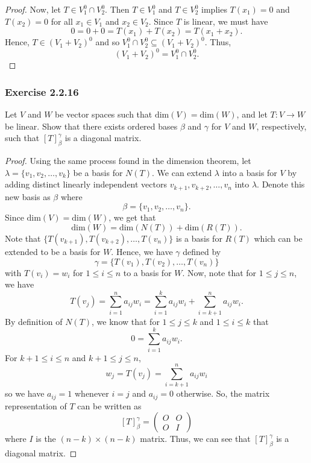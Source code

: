\begin{enumerate}
\begin{proof}
        Now, let \( T \in {V}_{1}^{0} \cap V_{2}^{0} \). Then \( T \in {V}_{1}^{0} \) and \( T \in {V}_{2}^{0} \) implies \( T({x}_{1}) = 0  \) and \( T({x}_{2}) = 0  \) for all \( {x}_{1} \in {V}_{1} \) and \( {x}_{2} \in {V}_{2} \). Since \( T  \) is linear, we must have 
        \[   0 = 0 + 0 =  T({x}_{1}) + T({x}_{2}) = T({x}_{1} + {x}_{2}).  \]
        Hence, \( T \in ({V}_{1} + {V}_{2})^{0}  \) and so \( {V}_{1}^{0} \cap V_{2}^{0} \subseteq ({V}_{1} + {V}_{2})^{0} \). Thus, 
        \[ ({V}_{1} + {V}_{2})^{0} = {V}_{1}^{0} \cap {V}_{2}^{0}. \]
        \end{proof}
\end{enumerate}

\subsubsection{Exercise 2.2.16} Let \( V  \) and \( W  \) be vector spaces such that \( \text{dim}(V) = \text{dim}(W) \), and let \( T: V \to W  \) be linear. Show that there exists ordered bases \( \beta  \) and \( \gamma \) for \( V  \) and \( W  \), respectively, such that \( [T]_{\beta}^{\gamma}  \) is a diagonal matrix.
\begin{proof}
    Using the same process found in the dimension theorem, let \( \lambda = \{ {v}_{1}, {v}_{2}, \dots, {v}_{k } \}   \) be a basis for \( N(T) \). We can extend \( \lambda  \) into a basis for \( V  \) by adding distinct linearly independent vectors \( {v}_{k+1}, {v}_{k+2}, \dots, {v}_{n}   \) into \( \lambda \). Denote this new basis as \( \beta  \) where
\[  \beta = \{ {v}_{1}, {v}_{2}, \dots, {v}_{n} \}. \]
Since \( \text{dim}(V) = \text{dim}(W) \), we get that
\[  \text{dim}(W) = \text{dim}(N(T)) + \text{dim}(R(T)). \tag{1} \] 
Note that \( \{ T({v}_{k+1}), T({v}_{k+2}), \dots, T({v}_{n}) \}  \) is a basis for \( R(T) \) which can be extended to be a basis for \( W  \). Hence, we have \( \gamma \) defined by
\[  \gamma = \{ T({v}_{1}), T({v}_{2}) , \dots,  T({v}_{n})\}  \]
with \( T({v}_{i}) = {w}_{i} \) for \( 1 \leq i \leq n \) to a basis for \( W  \). Now, note that for \( 1 \leq j \leq n \), we have 
\[  T({v}_{j}) = \sum_{ i=1 }^{ n } {a}_{ij} {w}_{i} = \sum_{ i=1 }^{ k  } {a}_{ij} {w}_{i} + \sum_{ i=k+1 }^{ n }{a}_{ij} {w}_{i}.  \]  
By definition of \( N(T) \), we know that for \( 1 \leq j \leq k  \) and \( 1 \leq i \leq k  \) that  
\[  0 = \sum_{ i=1 }^{ k  } {a}_{ij} {w}_{i}. \]
For \( k +1 \leq i \leq  n \) and \( k + 1 \leq j \leq n  \), 
\[  {w}_{j} = T({v}_{j}) = \sum_{ i=k+1 }^{ n } {a}_{ij} {w}_{i} \] so we have \( {a}_{ij} = 1  \) whenever \( i = j  \) and \( {a}_{ij} = 0  \) otherwise. So, the matrix representation of \( T  \) can be written as 
\[  [T]_{\beta}^{\gamma}  = \begin{pmatrix}
    O & O \\
    O & I 
\end{pmatrix} \] where \( I  \) is the \( (n-k) \times (n-k ) \) matrix. Thus, we can see that \( [T]_{\beta}^{\gamma}  \) is a diagonal matrix. 
\end{proof}

